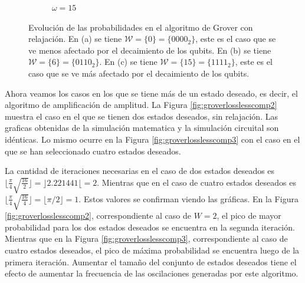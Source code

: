 \begin{figure}[H]
\begin{subfigure}[m]{0.49\textwidth}
        \caption{$\omega = 15$}
        \label{fig:groverloss1111}
    \end{subfigure}
    \caption[Evolución de las probabilidades en el algoritmo de Grover con relajación, $\mathcal{W} = \{0\}$]{Evolución de las probabilidades en el algoritmo de Grover con relajación. En (a) se tiene $\mathcal{W} = \{0\} = \{0000_2\}$, este es el caso que se ve menos afectado por el decaimiento de los qubits. En (b) se tiene $\mathcal{W} = \{6\} = \{0110_2\}$. En (c) se tiene $\mathcal{W} = \{15\} = \{1111_2\}$, este es el caso que se ve más afectado por el decaimiento de los qubits.}
    \label{fig:groverloss}
\end{figure}

Ahora veamos los casos en los que se tiene más de un estado deseado, es decir, el algoritmo de amplificación de amplitud. La Figura \ref{fig:groverlosslesscomp2} muestra el caso en el que se tienen dos estados deseados, sin relajación. Las graficas obtenidas de la simulación matematica y la simulación circuital son idénticas. Lo mismo ocurre en la Figura \ref{fig:groverlosslesscomp3} con el caso en el que se han seleccionado cuatro estados deseados.

La cantidad de iteraciones necesarias en el caso de dos estados deseados es $\lfloor \frac{\pi}{4} \sqrt{\frac{16}{2}} \rfloor = \rfloor 2.221441 \lfloor = 2$. Mientras que en el caso de cuatro estados deseados es $\lfloor \frac{\pi}{4} \sqrt{\frac{16}{4}} \rfloor = \lfloor \pi/2 \rfloor = 1$. Estos valores se confirman viendo las gráficas. En la Figura \ref{fig:groverlosslesscomp2}, correspondiente al caso de $W = 2$, el pico de mayor probabilidad para los dos estados deseados se encuentra en la segunda iteración. Mientras que en la Figura \ref{fig:groverlosslesscomp3}, correspondiente al caso de cuatro estados deseados, el pico de máxima probabilidad se encuentra luego de la primera iteración. Aumentar el tamaño del conjunto de estados deseados tiene el efecto de aumentar la frecuencia de las oscilaciones generadas por este algoritmo.

